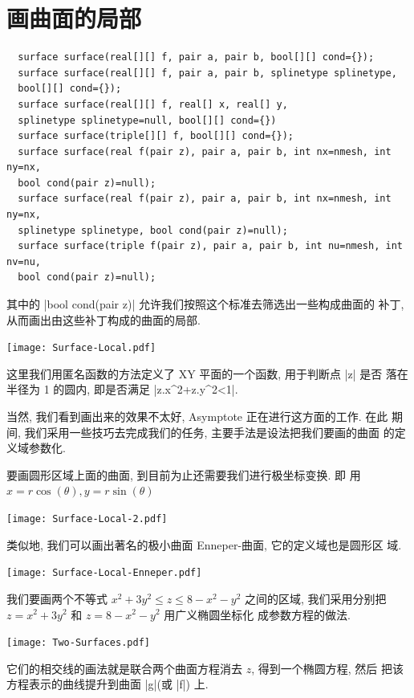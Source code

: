 \documentclass[nofonts,CJKnormalspaces]{ctexbook}
\let\leq\leqslant
\begin{document}
\section{画曲面的局部}
\begin{lstlisting}
  surface surface(real[][] f, pair a, pair b, bool[][] cond={});
  surface surface(real[][] f, pair a, pair b, splinetype splinetype,
  bool[][] cond={});
  surface surface(real[][] f, real[] x, real[] y,
  splinetype splinetype=null, bool[][] cond={})
  surface surface(triple[][] f, bool[][] cond={});
  surface surface(real f(pair z), pair a, pair b, int nx=nmesh, int ny=nx,
  bool cond(pair z)=null);
  surface surface(real f(pair z), pair a, pair b, int nx=nmesh, int ny=nx,
  splinetype splinetype, bool cond(pair z)=null);
  surface surface(triple f(pair z), pair a, pair b, int nu=nmesh, int nv=nu,
  bool cond(pair z)=null);
\end{lstlisting}
其中的 |bool cond(pair z)| 允许我们按照这个标准去筛选出一些构成曲面的
补丁, 从而画出由这些补丁构成的曲面的局部.
\begin{center}\texttt{[image: Surface-Local.pdf]}\end{center}%

这里我们用匿名函数的方法定义了 XY 平面的一个函数, 用于判断点 |z| 是否
落在半径为 1 的圆内, 即是否满足 |z.x^2+z.y^2<1|.

当然, 我们看到画出来的效果不太好, Asymptote 正在进行这方面的工作. 在此
期间, 我们采用一些技巧去完成我们的任务, 主要手法是设法把我们要画的曲面
的定义域参数化.

要画圆形区域上面的曲面, 到目前为止还需要我们进行极坐标变换. 即
用 \label{surface:local}
$x=r\cos(\theta),y=r\sin(\theta)$
\begin{center}\texttt{[image: Surface-Local-2.pdf]}\end{center}%

类似地, 我们可以画出著名的极小曲面 Enneper-曲面, 它的定义域也是圆形区
域.
\begin{center}\texttt{[image: Surface-Local-Enneper.pdf]}\end{center}%



我们要画两个不等式 $x^{2}+3y^{2}\leq z \leq 8-x^{2}-y^{2}$ 之间的区域,
我们采用分别把 $z=x^{2}+3y^{2}$ 和 $z=8-x^{2}-y^{2}$ 用广义椭圆坐标化
成参数方程的做法.\label{Surface:Local}
\begin{center}\texttt{[image: Two-Surfaces.pdf]}\end{center}%

它们的相交线的画法就是联合两个曲面方程消去 $z$, 得到一个椭圆方程, 然后
把该方程表示的曲线提升到曲面 |g|(或 |f|) 上.
\end{document}
